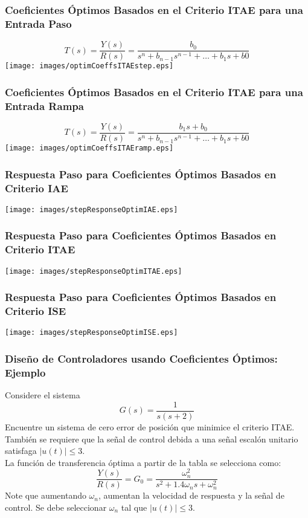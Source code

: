 \documentclass[aspectratio=169]{beamer}
\theoremstyle{definition}
\theoremstyle{plain}
\theoremstyle{remark}
\begin{document}
\begin{frame}[<+->]\frametitle{Coeficientes Óptimos Basados en el Criterio ITAE para una Entrada Paso}
\centering
\begin{equation*}
	T(s) = \frac{Y(s)}{R(s)} = \frac{b_0}{s^n + b_{n-1} s^{n-1} + \dots + b_1 s + b0}
\end{equation*}
\vspace*{10mm}
\texttt{[image: images/optimCoeffsITAEstep.eps]}
\end{frame}

\begin{frame}[<+->]\frametitle{Coeficientes Óptimos Basados en el Criterio ITAE para una Entrada Rampa}
\centering
\begin{equation*}
	T(s) = \frac{Y(s)}{R(s)} = \frac{b_1s + b_0}{s^n + b_{n-1} s^{n-1} + \dots + b_1 s + b0}
\end{equation*}
\vspace*{10mm}
\texttt{[image: images/optimCoeffsITAEramp.eps]} 
\end{frame}

\begin{frame}[c]\frametitle{Respuesta Paso para Coeficientes Óptimos Basados en Criterio IAE}
\vspace*{5mm}
\centering
\texttt{[image: images/stepResponseOptimIAE.eps]}
\end{frame}

\begin{frame}[c]\frametitle{Respuesta Paso para Coeficientes Óptimos Basados en Criterio ITAE}
\vspace*{5mm}
\centering
\texttt{[image: images/stepResponseOptimITAE.eps]}
\end{frame}

\begin{frame}[c]\frametitle{Respuesta Paso para Coeficientes Óptimos Basados en Criterio ISE}
\vspace*{5mm}
\centering
\texttt{[image: images/stepResponseOptimISE.eps]}
\end{frame}

\begin{frame}[<+->]\frametitle{Diseño de Controladores usando Coeficientes Óptimos: Ejemplo}
Considere el sistema
\begin{equation*}
	G(s) = \frac{1}{s(s+2)}
\end{equation*}
Encuentre un sistema de cero error de posición que minimice el criterio ITAE. También se requiere que la señal de control debida a una señal escalón unitario satisfaga $|u(t)| \leq 3$.\\
\vspace*{3mm}
La función de transferencia óptima a partir de la tabla se selecciona como:
\begin{equation*}
	\frac{Y(s)}{R(s)} = G_0 = \frac{\omega_n^2}{s^2 + 1.4 \omega_n s + \omega_n^2}
\end{equation*}
Note que aumentando $\omega_n$, aumentan la velocidad de respuesta y la señal de control. Se debe seleccionar $\omega_n$ tal que $|u(t)| \leq 3$.
\end{frame}
\end{document}
